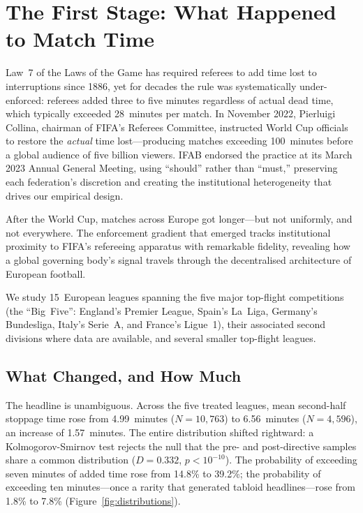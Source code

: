 
\section{The First Stage: What Happened to Match Time}
\label{sec:first_stage}

Law~7 of the Laws of the Game has required referees to add time lost to
interruptions since 1886, yet for decades the rule was systematically
under-enforced: referees added three to five minutes regardless of
actual dead time, which typically exceeded 28~minutes per match.
In November 2022, Pierluigi Collina, chairman of FIFA's Referees
Committee, instructed World Cup officials to restore the \textit{actual}
time lost---producing matches exceeding 100~minutes before a global
audience of five billion viewers.
IFAB endorsed the practice at its March 2023 Annual General Meeting,
using ``should'' rather than ``must,'' preserving each federation's
discretion and creating the institutional heterogeneity that drives
our empirical design.

After the World Cup, matches across Europe got longer---but not
uniformly, and not everywhere. The enforcement gradient that emerged
tracks institutional proximity to FIFA's refereeing apparatus with
remarkable fidelity, revealing how a global governing body's signal
travels through the decentralised architecture of European football.

We study 15~European leagues spanning the five major top-flight
competitions (the ``Big~Five'': England's Premier League, Spain's
La~Liga, Germany's Bundesliga, Italy's Serie~A, and France's
Ligue~1), their associated second divisions where data are available,
and several smaller top-flight leagues.


\subsection{What Changed, and How Much}
\label{sec:first_stage:magnitude}

The headline is unambiguous. Across the five treated leagues, mean
second-half stoppage time rose from 4.99~minutes ($N = 10{,}763$) to
6.56~minutes ($N = 4{,}596$), an increase of 1.57~minutes. The entire
distribution shifted rightward: a Kolmogorov-Smirnov test rejects the
null that the pre- and post-directive samples share a common distribution
($D = 0.332$, $p < 10^{-10}$). The probability of exceeding seven
minutes of added time rose from 14.8\% to 39.2\%; the probability of
exceeding ten minutes---once a rarity that generated tabloid
headlines---rose from 1.8\% to 7.8\% (Figure~\ref{fig:distributions}).

